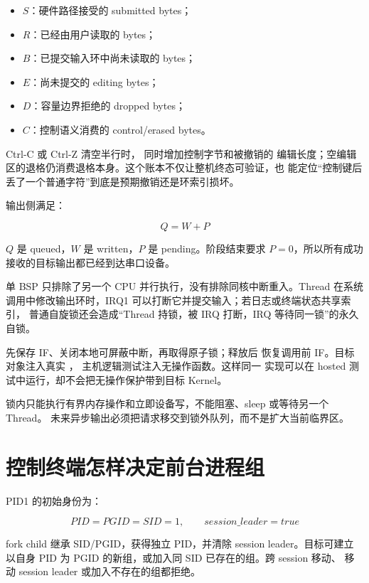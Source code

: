 \begin{itemize}
  \item \(S\)：硬件路径接受的 submitted bytes；
  \item \(R\)：已经由用户读取的 bytes；
  \item \(B\)：已提交输入环中尚未读取的 bytes；
  \item \(E\)：尚未提交的 editing bytes；
  \item \(D\)：容量边界拒绝的 dropped bytes；
  \item \(C\)：控制语义消费的 control/erased bytes。
\end{itemize}

Ctrl-C 或 Ctrl-Z 清空半行时， 同时增加控制字节和被撤销的
编辑长度；空编辑区的退格仍消费退格本身。这个账本不仅让整机终态可验证，也
能定位“控制键后丢了一个普通字符”到底是预期撤销还是环索引损坏。

输出侧满足：

\[
Q=W+P
\]

\(Q\) 是 queued，\(W\) 是 written，\(P\) 是 pending。阶段结束要求
\(P=0\)，所以所有成功接收的目标输出都已经到达串口设备。

单 BSP 只排除了另一个 CPU 并行执行，没有排除同核中断重入。Thread 在系统
调用中修改输出环时，IRQ1 可以打断它并提交输入；若日志或终端状态共享索引，
普通自旋锁还会造成“Thread 持锁，被 IRQ 打断，IRQ 等待同一锁”的永久自锁。

 先保存 IF、关闭本地可屏蔽中断，再取得原子锁；释放后
恢复调用前 IF。目标对象注入真实 ，
主机逻辑测试注入无操作函数。这样同一  实现可以在 hosted
测试中运行，却不会把无操作保护带到目标 Kernel。

\begin{contractbox}
锁内只能执行有界内存操作和立即设备写，不能阻塞、sleep 或等待另一个 Thread。
未来异步输出必须把请求移交到锁外队列，而不是扩大当前临界区。
\end{contractbox}

\section{控制终端怎样决定前台进程组}
PID1 的初始身份为：

\[
PID=PGID=SID=1,\qquad session\_leader=true
\]

fork child 继承 SID/PGID，获得独立 PID，并清除 session leader。目标可建立
以自身 PID 为 PGID 的新组，或加入同 SID 已存在的组。跨 session 移动、
移动 session leader 或加入不存在的组都拒绝。

